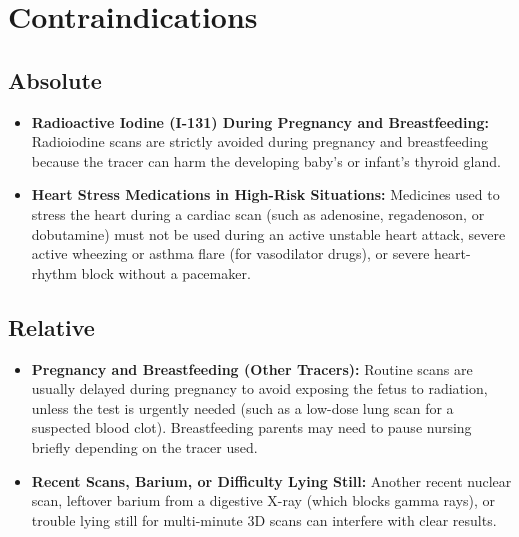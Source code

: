 \section{Contraindications}

\subsection{Absolute}
\begin{itemize}
\item \textbf{Radioactive Iodine (I-131) During Pregnancy and Breastfeeding:} Radioiodine scans are strictly avoided during pregnancy and breastfeeding because the tracer can harm the developing baby's or infant's thyroid gland.
\item \textbf{Heart Stress Medications in High-Risk Situations:} Medicines used to stress the heart during a cardiac scan (such as adenosine, regadenoson, or dobutamine) must not be used during an active unstable heart attack, severe active wheezing or asthma flare (for vasodilator drugs), or severe heart-rhythm block without a pacemaker.
\end{itemize}

\subsection{Relative}
\begin{itemize}
\item \textbf{Pregnancy and Breastfeeding (Other Tracers):} Routine scans are usually delayed during pregnancy to avoid exposing the fetus to radiation, unless the test is urgently needed (such as a low-dose lung scan for a suspected blood clot). Breastfeeding parents may need to pause nursing briefly depending on the tracer used.
\item \textbf{Recent Scans, Barium, or Difficulty Lying Still:} Another recent nuclear scan, leftover barium from a digestive X-ray (which blocks gamma rays), or trouble lying still for multi-minute 3D scans can interfere with clear results.
\end{itemize}

